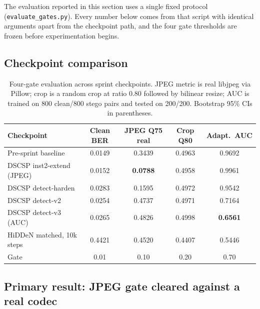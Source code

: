 The evaluation reported in this section uses a single fixed protocol
(\texttt{evaluate\_gates.py}). Every number below comes from that
script with identical arguments apart from the checkpoint path, and
the four gate thresholds are frozen before experimentation begins.

\subsection{Checkpoint comparison}

\begin{table}[t]
\centering
\caption{Four-gate evaluation across sprint checkpoints. JPEG metric is
real libjpeg via Pillow; crop is a random crop at ratio $0.80$ followed
by bilinear resize; AUC is trained on 800 clean/800 stego pairs and
tested on 200/200. Bootstrap 95\% CIs in parentheses.}
\label{tab:sprint-gates}
\begin{tabular}{lcccc}
\toprule
Checkpoint & Clean BER & JPEG Q75 real & Crop Q80 & Adapt.\ AUC \\
\midrule
Pre-sprint baseline              & 0.0149 & 0.3439 & 0.4963 & 0.9692 \\
DSCSP inst2-extend (JPEG)        & 0.0152 & \textbf{0.0788} & 0.4958 & 0.9961 \\
DSCSP detect-harden              & 0.0283 & 0.1595 & 0.4972 & 0.9542 \\
DSCSP detect-v2                  & 0.0254 & 0.4737 & 0.4971 & 0.7164 \\
DSCSP detect-v3 (AUC)            & 0.0265 & 0.4826 & 0.4998 & \textbf{0.6561} \\
HiDDeN matched, 10k steps\footnotemark[1] & 0.4421 & 0.4520 & 0.4407 & 0.5446 \\
\midrule
Gate                             & 0.01 & 0.10 & 0.20 & 0.70 \\
\bottomrule
\end{tabular}

\end{table}

\subsection{Primary result: JPEG gate cleared against a real codec}

